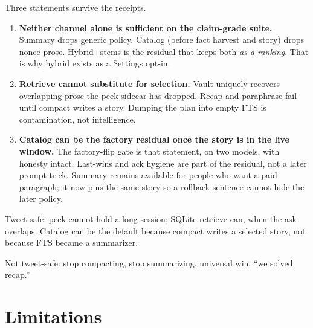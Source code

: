 \documentclass[11pt]{article}
\begin{document}
Three statements survive the receipts.

\begin{enumerate}[leftmargin=1.3em]
\item \textbf{Neither channel alone is sufficient on the claim-grade
  suite.} Summary drops generic policy. Catalog (before fact harvest
  and story) drops nonce prose. Hybrid+stems is the residual that
  keeps both \emph{as a ranking}. That is why hybrid exists as a
  Settings opt-in.
\item \textbf{Retrieve cannot substitute for selection.} Vault uniquely
  recovers overlapping prose the peek sidecar has dropped. Recap and
  paraphrase fail until compact writes a story. Dumping the plan into
  empty FTS is contamination, not intelligence.
\item \textbf{Catalog can be the factory residual once the story is in
  the live window.} The factory-flip gate is that statement, on two
  models, with honesty intact. Last-wins and ack hygiene are part of
  the residual, not a later prompt trick. Summary remains available
  for people who want a paid paragraph; it now pins the same story so
  a rollback sentence cannot hide the later policy.
\end{enumerate}

Tweet-safe: peek cannot hold a long session; SQLite retrieve can, when
the ask overlaps. Catalog can be the default because compact writes a
selected story, not because FTS became a summarizer.

Not tweet-safe: stop compacting, stop summarizing, universal win, ``we
solved recap.''

\section{Limitations}
\label{sec:limits}
\end{document}
